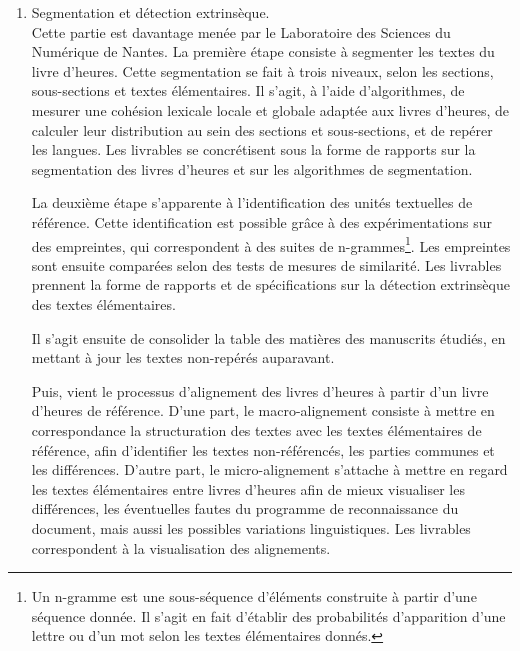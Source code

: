 \documentclass[a4paper,12pt,twoside]{book}
\begin{document}
\begin{enumerate}
	    Enfin, la dernière étape consiste à développer une interface graphique pour traiter le corpus. Il s'agit de pouvoir appliquer la chaîne de traitement à tous les manuscrits et de présenter les résultats dans une interface web\footcite[p. 13-14]{HORAE_projet}. Cette étape se concrétise dans la mise à disposition de l'interface Arkindex utilisée pendant le stage. \\
	    
	    \item \og Segmentation et détection extrinsèque\fg{}. \\
	    
	    Cette partie est davantage menée par le Laboratoire des Sciences du Numérique de Nantes. La première étape consiste à segmenter les textes du livre d'heures. Cette segmentation se fait à trois niveaux, selon les sections, sous-sections et textes élémentaires. Il s'agit, à l'aide d'algorithmes, de mesurer une cohésion lexicale locale et globale adaptée aux livres d'heures, de calculer leur distribution au sein des sections et sous-sections, et de repérer les langues. Les livrables se concrétisent sous la forme de rapports sur la segmentation des livres d'heures et sur les algorithmes de segmentation.
	    
	    La deuxième étape s'apparente à l'identification des unités textuelles de référence. Cette identification est possible grâce à des expérimentations sur des empreintes, qui correspondent à des suites de n-grammes\footnote{Un n-gramme est une sous-séquence d'éléments construite à partir d'une séquence donnée. Il s'agit en fait d'établir des probabilités d'apparition d'une lettre ou d'un mot selon les textes élémentaires donnés.}. Les empreintes sont ensuite comparées selon des tests de mesures de similarité. Les livrables prennent la forme de rapports et de spécifications sur la détection extrinsèque des textes élémentaires. 
	    
	    Il s'agit ensuite de consolider la \og table des matières\fg{} des manuscrits étudiés, en mettant à jour les textes non-repérés auparavant. 
	    
	    Puis, vient le processus d'alignement des livres d'heures à partir d'un livre d'heures de référence. D'une part, le macro-alignement consiste à mettre en correspondance la structuration des textes avec les textes élémentaires de référence, afin d'identifier les textes non-référencés, les parties communes et les différences. D'autre part, le micro-alignement s'attache à mettre en regard les textes élémentaires entre livres d'heures afin de mieux visualiser les différences, les éventuelles fautes du programme de reconnaissance du document, mais aussi les possibles variations linguistiques. Les livrables correspondent à la visualisation des alignements. 
	    

\end{enumerate}
\end{document}
